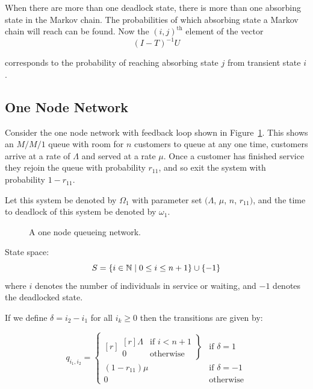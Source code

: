\documentclass{article}
\begin{document}
When there are more than one deadlock state, there is more than one absorbing state in the Markov chain.
The probabilities of which absorbing state a Markov chain will reach can be found.
Now the $(i, j)^{\text{th}}$ element of the vector
\begin{equation}
  (I - T)^{-1}U
\end{equation}

corresponds to the probability of reaching absorbing state $j$ from transient state $i$.

\subsection{One Node Network}\label{sec:1nodenet}
Consider the one node network with feedback loop shown in Figure~\ref{fig:queueingnetwork_1node}.
This shows an \(M/M/1\) queue with room for $n$ customers to queue at any one time, customers arrive at a rate of $\Lambda$ and served at a rate $\mu$.
Once a customer has finished service they rejoin the queue with probability $r_{11}$, and so exit the system with probability $1 - r_{11}$.

Let this system be denoted by $\Omega_1$ with parameter set $(\Lambda$, $\mu$, $n$, $r_{11})$, and the time to deadlock of this system be denoted by $\omega_1$.

\begin{figure}[!htbp]
  
  \caption{A one node queueing network.}
  \label{fig:queueingnetwork_1node}
\end{figure}

State space:
        \[S = \{i\in\mathbb{N} \nonscript\; | \nonscript\; 0 \leq i \leq n + 1
        \}\cup\{-1\}\]
where \(i\) denotes the number of individuals in service or waiting, and $-1$ denotes the deadlocked state.

If we define $\delta = i_2 - i_1$ for all $i_k \geq 0$ then the transitions are given by:

\begin{equation}
  q_{i_1, i_2} = \left\{
  \begin{matrix*}[ r ]
    \left. \begin{matrix*}[ r ]
      \Lambda & \text{if } i < n + 1 \\
      0 & \text{otherwise}
    \end{matrix*} \right\} & \text{if } \delta = 1 \\
    (1 - r_{11})\mu & \text{if } \delta = -1 \\
    0 & \text{otherwise}
  \end{matrix*} \right.
\end{equation}
\end{document}
